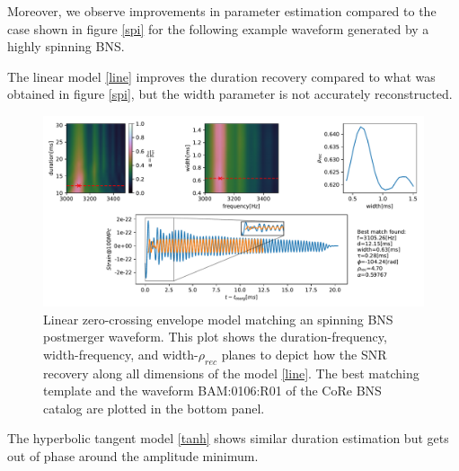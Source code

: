 \FloatBarrier


Moreover, we observe improvements in parameter estimation compared to the case shown in figure \ref{spi} for the following example waveform generated by a highly spinning BNS. 

The linear model \ref{line} improves the duration recovery compared to what was obtained in figure \ref{spi},  but the width parameter is not accurately reconstructed.

\begin{figure}[hbt!]
\begin{center}
\includegraphics[width=\textwidth, angle=0]{images/Data_analysis/results/envel_110_lin.pdf}
\captionsetup{width=0.8\textwidth}
\caption[Linear zero-crossing envelope model matching a spinning BNS postmerger waveform]{Linear zero-crossing envelope model matching an spinning BNS postmerger waveform. This plot shows the duration-frequency, width-frequency, and width-$\rho_{rec}$ planes to depict how the SNR recovery along all dimensions of the model \ref{line}. The best matching template and the waveform BAM:0106:R01 of the CoRe BNS catalog \cite{Dietrich:2018phi} are plotted in the bottom panel.}
\end{center}
\end{figure}

\FloatBarrier

The hyperbolic tangent model \ref{tanh} shows similar duration estimation but gets out of phase around the amplitude minimum.

